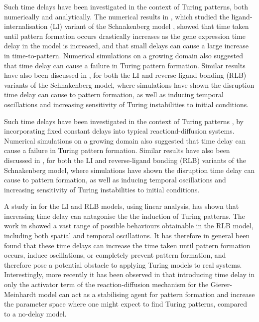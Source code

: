 Such time delays have been investigated in the context of Turing patterns, both numerically and analytically. The numerical results in \cite{gaffmonk}, which studied the ligand-internalisation (LI) variant of the Schnakenberg model \cite{schnakenberg}, showed that time taken until pattern formation occurs drastically increases as the gene expression time delay in the model is increased, and that small delays can cause a large increase in time-to-pattern. Numerical simulations on a growing domain also suggested that time delay can cause a failure in Turing pattern formation. Similar results have also been discussed in \cite{leegaffney,leegaffmonk}, for both the LI and reverse-ligand bonding (RLB) variants of the Schnakenberg model, where simulations have shown the disruption time delay can cause to pattern formation, as well as inducing temporal oscillations and increasing sensitivity of Turing instabilities to initial conditions.

Such time delays have been investigated in the context of Turing patterns \cite{gaffmonk,leegaffney,yigaffneyli,jiang,leegaffmonk,bratsun,william}, by incorporating fixed constant delays into typical reactiond-diffusion systems.  Numerical simulations on a growing domain also suggested that time delay can cause a failure in Turing pattern formation. Similar results have also been discussed in \cite{leegaffney,leegaffmonk}, for both the LI and reverse-ligand bonding (RLB) variants of the Schnakenberg model, where simulations have shown the disruption time delay can cause to pattern formation, as well as inducing temporal oscillations and increasing sensitivity of Turing instabilities to initial conditions.

A study in \cite{yigaffneyli} for the LI and RLB models, using linear analysis, has shown that increasing time delay can antagonise the the induction of Turing patterns. The work in \cite{jiang} showed a vast range of possible behaviours obtainable in the RLB model, including both spatial and temporal oscillations. It has therefore in general been found that these time delays can increase the time taken until pattern formation occurs, induce oscillations, or completely prevent pattern formation, and therefore pose a potential obstacle to applying Turing models to real systems. Interestingly, more recently it has been observed in \cite{fadai} that introducing time delay in only the activator term of the reaction-diffusion mechanism for the Gierer-Meinhardt model can act as a stabilising agent for pattern formation and increase the parameter space where one might expect to find Turing patterns, compared to a no-delay model.

